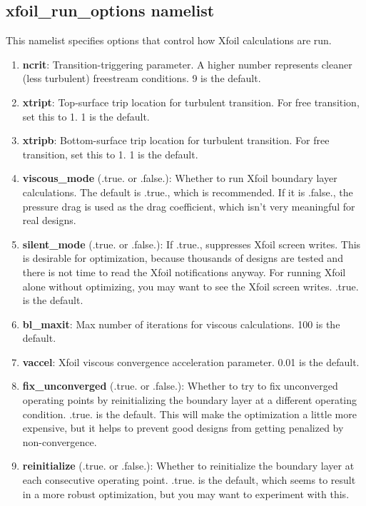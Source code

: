 \documentclass[11pt]{article}
\begin{document}
\subsection{xfoil\_run\_options namelist}

This namelist specifies options that control how Xfoil calculations are run.

\begin{enumerate}
\item{\textbf{ncrit}: Transition-triggering parameter.  A higher number represents cleaner
(less turbulent) freestream conditions.  9 is the default.}
\item{\textbf{xtript}: Top-surface trip location for turbulent transition.  For free
transition, set this to 1.  1 is the default.}
\item{\textbf{xtripb}: Bottom-surface trip location for turbulent transition.  For free
transition, set this to 1.  1 is the default.}
\item{\textbf{viscous\_mode} (.true. or .false.): Whether to run Xfoil boundary layer
calculations.  The default is .true., which is recommended.  If it is .false., the pressure
drag is used as the drag coefficient, which isn't very meaningful for real designs.}
\item{\textbf{silent\_mode} (.true. or .false.): If .true., suppresses Xfoil screen writes.
This is desirable for optimization, because thousands of designs are tested and there is
not time to read the Xfoil notifications anyway.  For running Xfoil alone without
optimizing, you may want to see the Xfoil screen writes.  .true. is the default.}
\item{\textbf{bl\_maxit}: Max number of iterations for viscous calculations.  100 is the
default.}
\item{\textbf{vaccel}: Xfoil viscous convergence acceleration parameter.  0.01 is the
default.}
\item{\textbf{fix\_unconverged} (.true. or .false.): Whether to try to fix
unconverged operating points by reinitializing the boundary layer at a different operating
condition.  .true. is the default.  This will make the optimization a little more
expensive, but it helps to prevent good designs from getting penalized by
non-convergence.}
\item{\textbf{reinitialize} (.true. or .false.): Whether to reinitialize the boundary
layer at each consecutive operating point.  .true. is the default, which seems to result 
in a more robust optimization, but you may want to experiment with this.}
\end{enumerate}
\end{document}
